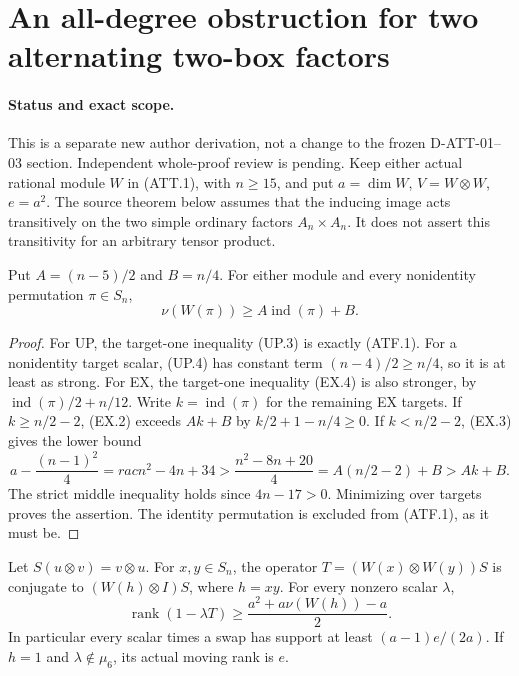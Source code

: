 \section{An all-degree obstruction for two alternating two-box factors}
\label{sec:alternating-two-factor}

\paragraph{Status and exact scope.}
This is a separate new author derivation, not a change to the frozen
D-ATT-01--03 section. Independent whole-proof review is pending.
Keep either actual rational module $W$ in (ATT.1), with $n\ge15$,
and put $a=\dim W$, $V=W\otimes W$, $e=a^2$.
The source theorem below assumes that the inducing image acts
transitively on the two simple ordinary factors $A_n\times A_n$.
It does not assert this transitivity for an arbitrary tensor product.

\begin{lemma}
\label{D-ATT-04}
Put $A=(n-5)/2$ and $B=n/4$. For either module and every
nonidentity permutation $\pi\in S_n$,
\[
                 \nu(W(\pi))\ge A\operatorname{ind}(\pi)+B.
                                                               \tag{ATF.1}
\]
\end{lemma}

\begin{proof}
For UP, the target-one inequality (UP.3) is exactly (ATF.1).
For a nonidentity target scalar, (UP.4) has constant term
$(n-4)/2\ge n/4$, so it is at least as strong.
For EX, the target-one inequality (EX.4) is also stronger,
by $\operatorname{ind}(\pi)/2+n/12$.
Write $k=\operatorname{ind}(\pi)$ for the remaining EX targets.
If $k\ge n/2-2$, (EX.2) exceeds $Ak+B$ by
$k/2+1-n/4\ge0$. If $k<n/2-2$, (EX.3) gives the lower bound
\[
 a-\frac{(n-1)^2}{4}=rac{n^2-4n+3}{4}
 >\frac{n^2-8n+20}{4}
   =A(n/2-2)+B>Ak+B.                                      \tag{ATF.2}
\]
The strict middle inequality holds since $4n-17>0$.
Minimizing over targets proves the assertion. The identity
permutation is excluded from (ATF.1), as it must be.
\end{proof}

\begin{lemma}
\label{D-ATT-05}
Let $S(u\otimes v)=v\otimes u$. For $x,y\in S_n$, the
operator $T=(W(x)\otimes W(y))S$ is conjugate to
$(W(h)\otimes I)S$, where $h=xy$. For every nonzero scalar $\lambda$,
\[
 \operatorname{rank}(1-\lambda T)
       \ge\frac{a^2+a\nu(W(h))-a}{2}.                     \tag{ATF.3}
\]
In particular every scalar times a swap has support at least
$(a-1)e/(2a)$. If $h=1$ and $\lambda\notin\mu_6$, its
actual moving rank is $e$.
\end{lemma}

